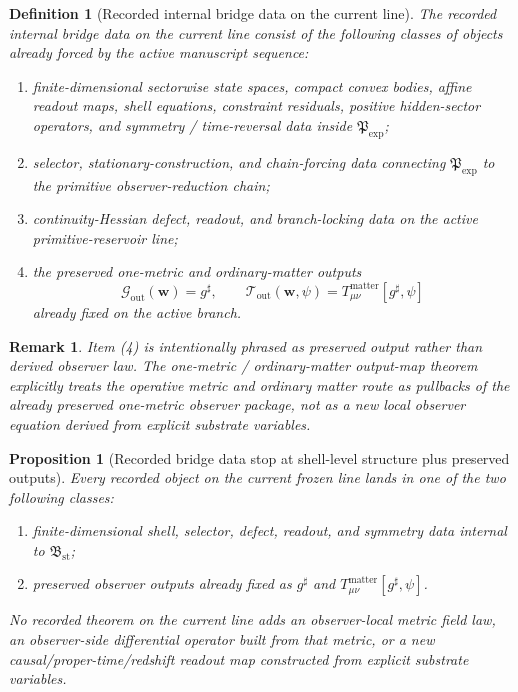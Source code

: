 \documentclass[11pt]{article}
\newcommand{\ExplicitPackage}{\mathfrak P_{\mathrm{exp}}}
\newcommand{\StableBridgeObject}{\mathfrak B_{\mathrm{st}}}
\newcommand{\FixedMetric}{g^{\sharp}}
\newcommand{\MetricOut}{\mathscr G_{\mathrm{out}}}
\newcommand{\MatterOut}{\mathscr T_{\mathrm{out}}}
\newtheorem{definition}{Definition}
\newtheorem{proposition}{Proposition}
\newtheorem{remark}{Remark}
\begin{document}
\begin{definition}[Recorded internal bridge data on the current line]
\label{def:recorded}
The \emph{recorded internal bridge data} on the current line consist of the following classes of objects already forced by the active manuscript sequence:
\begin{enumerate}
    \item finite-dimensional sectorwise state spaces, compact convex bodies, affine readout maps, shell equations, constraint residuals, positive hidden-sector operators, and symmetry / time-reversal data inside \(\ExplicitPackage\);
    \item selector, stationary-construction, and chain-forcing data connecting \(\ExplicitPackage\) to the primitive observer-reduction chain;
    \item continuity-Hessian defect, readout, and branch-locking data on the active primitive-reservoir line;
    \item the preserved one-metric and ordinary-matter outputs
    \[
    \MetricOut(\mathbf w)=\FixedMetric,
    \qquad
    \MatterOut(\mathbf w,\psi)=T_{\mu\nu}^{\mathrm{matter}}[\FixedMetric,\psi]
    \]
    already fixed on the active branch.
\end{enumerate}
\end{definition}

\begin{remark}
Item (4) is intentionally phrased as preserved output rather than derived observer law. The one-metric / ordinary-matter output-map theorem explicitly treats the operative metric and ordinary matter route as pullbacks of the already preserved one-metric observer package, not as a new local observer equation derived from explicit substrate variables.
\end{remark}

\begin{proposition}[Recorded bridge data stop at shell-level structure plus preserved outputs]
\label{prop:recorded_scope}
Every recorded object on the current frozen line lands in one of the two following classes:
\begin{enumerate}
    \item finite-dimensional shell, selector, defect, readout, and symmetry data internal to \(\StableBridgeObject\);
    \item preserved observer outputs already fixed as \(\FixedMetric\) and \(T_{\mu\nu}^{\mathrm{matter}}[\FixedMetric,\psi]\).
\end{enumerate}
No recorded theorem on the current line adds an observer-local metric field law, an observer-side differential operator built from that metric, or a new causal/proper-time/redshift readout map constructed from explicit substrate variables.
\end{proposition}
\end{document}
